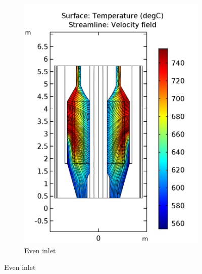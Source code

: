 \documentclass{elsarticle}
\begin{document}
\begin{figure}
\begin{subfigure}[b]{0.42\textwidth}
        \includegraphics[width=\textwidth]{images/diffusion/mk1/SS/flow_opti/T_flibe_even1.png}
        \caption{Even inlet}
    \end{subfigure}
  

\end{figure}
\end{document}
